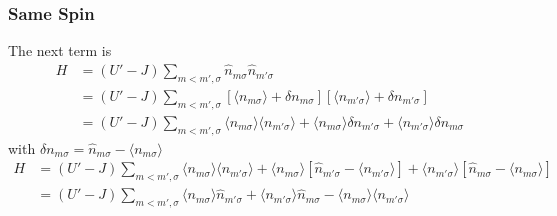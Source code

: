 \documentclass[11pt]{article}
\begin{document}
\subsubsection{Same Spin}
The next term is
\begin{align}
    H &= (U'-J) \sum_{m < m', \sigma} \hat n_{m\sigma} \hat n_{m' \sigma} \\\nonumber
      &= (U'-J) \sum_{m < m', \sigma} [\langle n_{m \sigma}\rangle + \delta n_{m\sigma}][\langle n_{m'\sigma}\rangle + \delta n_{m'\sigma}]\\\nonumber
      &= (U'-J) \sum_{m < m', \sigma} \langle n_{m\sigma}\rangle\langle n_{m'\sigma}\rangle
      + \langle n_{m\sigma}\rangle \delta n_{m' \sigma} + \langle n_{m'\sigma}\rangle\delta n_{m\sigma}
\end{align}
with $\delta n_{m\sigma} = \hat n_{m\sigma} - \langle n_{m\sigma}\rangle$
\begin{align}
    H &= (U'-J) \sum_{m < m', \sigma} \langle n_{m\sigma}\rangle\langle n_{m'\sigma}\rangle
      + \langle n_{m\sigma}\rangle [\hat n_{m'\sigma} - \langle n_{m'\sigma}\rangle] 
      + \langle n_{m'\sigma}\rangle[\hat n_{m\sigma} - \langle n_{m\sigma}\rangle] \\\nonumber
      &= (U'-J) \sum_{m < m', \sigma} \langle n_{m\sigma} \rangle \hat n_{m'\sigma}
      + \langle n_{m' \sigma} \rangle \hat n_{m \sigma}
      - \langle n_{m\sigma} \rangle \langle n_{m' \sigma} \rangle
\end{align}
\end{document}
